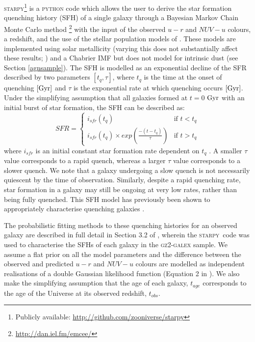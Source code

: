 \documentclass[useAMS,usenatbib]{mn2e}
\def\changed    {\color{nc} }
\def\secondchange    {\color{srv} }
\def\newref    {\color{new} }
\def\starpy ~{\textsc{starpy}}
\begin{document}
\textsc{starpy}\footnote{Publicly available: \url{http://github.com/zooniverse/starpy}} is a \textsc{python} code which allows the user to derive the star formation {\newref quenching} history (SFH) of a single galaxy through a Bayesian Markov Chain Monte Carlo method \citep{Dan}\footnote{\url{http://dan.iel.fm/emcee/}} with the input of the observed $u-r$ and $NUV-u$ colours, a redshift, and the use of the stellar population models of \cite{BC03}. {\changed These models are implemented using solar metallicity (varying this does not substantially affect these results; \citealt{Sme2015}) and a Chabrier IMF \citep{Chab03} {\secondchange but does not model for intrinsic dust (see Section \ref{agnsample})}. The SFH is modelled as an exponential decline of the SFR described by two parameters $[t_q, \tau]$, where $t_q$ is the time at the onset of quenching} $\rm{[Gyr]}$ and $\tau$ is the exponential rate at which quenching occurs $\rm{[Gyr]}$. Under the simplifying assumption that all galaxies formed at $t=0$ $\rm{ Gyr}$ with an initial burst of star formation, the SFH can be described as: 
\begin{equation}\label{sfh}
SFR =
\begin{cases}
i_{sfr}(t_q) & \text{if } t < t_q \\
i_{sfr}(t_q) \times exp{\left( \frac{-(t-t_{q})}{\tau}\right)} & \text{if } t > t_q 
\end{cases}
\end{equation}
where $i_{sfr}$ is an initial constant star formation rate dependent on $t_q$ \citep{Sch2014, Sme2015}.  A smaller $\tau$ value corresponds to a rapid quench, whereas a larger $\tau$ value corresponds to a slower quench. {\newref We note that a galaxy undergoing a slow quench is not necessarily quiescent by the time of observation. Similarly, despite a rapid quenching rate, star formation in a galaxy may still be ongoing at very low rates, rather than being fully quenched. } {\changed This SFH model has previously been shown to appropriately characterise quenching galaxies \citep{Weiner06, Martin07, Noeske07,Sch2014}.} 


The probabilistic fitting methods to these quenching histories for an observed galaxy are described in full detail in {\changed Section 3.2 of} \cite{Sme2015}, wherein the \starpy ~~code was used to characterise the SFHs of each galaxy in the \textsc{gz2-galex} sample. {\changed We assume a flat prior on all the model parameters and {\secondchange the difference between the observed and predicted $u-r$ and $NUV-u$ colours are modelled as independent realisations of a double Gaussian likelihood function} (Equation 2 in \citealt{Sme2015}).} {\secondchange We also make the simplifying assumption that the age of each galaxy, $t_{age}$ corresponds to the age of the Universe at its observed redshift, $t_{obs}$.} 
\end{document}
